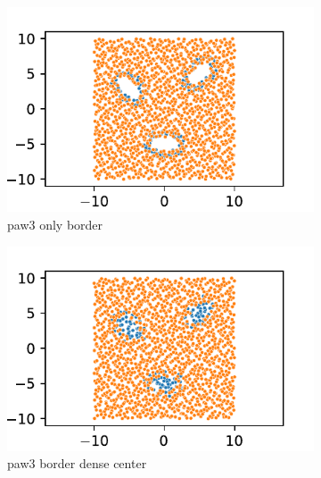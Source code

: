 \begin{figure}{}
\begin{subfigure}[b]{0.24\textwidth}
        \includegraphics[width=\textwidth]{../plots/synthetic_dataset_visualizations/paw3-2d-only-border.csv.pdf}
        \caption[]%
        {{\small paw3 only border}}    
        \label{fig:paw3ob}
    \end{subfigure}
    \begin{subfigure}[b]{0.24\textwidth}   
        \centering 
        \includegraphics[width=\textwidth]{../plots/synthetic_dataset_visualizations/paw3-2d-border-dense-center.csv.pdf}
        \caption[]%
        {{\small paw3 border dense center}}    
        \label{fig:paw3bdc}
    \end{subfigure}
    \begin{subfigure}[b]{0.24\textwidth}
        \centering

\end{subfigure}
\end{figure}
